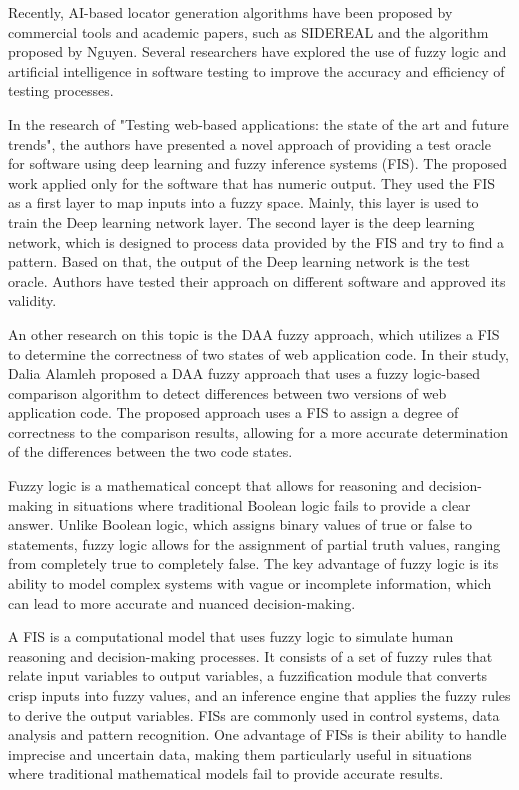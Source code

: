 \documentclass{article}
\begin{document}
Recently, AI-based locator generation algorithms have been proposed by commercial tools and academic papers\cite{ai_in_testing}, such as SIDEREAL\cite{sidereal} and the algorithm proposed by Nguyen\cite{nguyen}. Several researchers have explored the use of fuzzy logic and artificial intelligence in software testing to improve the accuracy and efficiency of testing processes.

In the research of "Testing web-based applications: the state of the art and future trends"\cite{state_of_art}, the authors have presented a novel approach of providing a test oracle for software using deep learning and fuzzy inference systems (FIS)\cite{fuzzy_logic}. The proposed work applied only for the software that has numeric output. They used the FIS as a first layer to map inputs into a fuzzy space. Mainly, this layer is used to train the Deep learning network layer. The second layer is the deep learning network, which is designed to process data provided by the FIS and try to find a pattern. Based on that, the output of the Deep learning network is the test oracle. Authors have tested their approach on different software and approved its validity.

An other research on this topic is the DAA fuzzy approach\cite{fuzzy_ai_in_web_testing}, which utilizes a FIS\cite{fuzzy_logic} to determine the correctness of two states of web application code. In their study, Dalia Alamleh proposed a DAA fuzzy approach that uses a fuzzy logic-based comparison algorithm to detect differences between two versions of web application code. The proposed approach uses a FIS\cite{fuzzy_logic} to assign a degree of correctness to the comparison results, allowing for a more accurate determination of the differences between the two code states.

Fuzzy logic\cite{fuzzy_logic} is a mathematical concept that allows for reasoning and decision-making in situations where traditional Boolean logic fails to provide a clear answer. Unlike Boolean logic, which assigns binary values of true or false to statements, fuzzy logic allows for the assignment of partial truth values, ranging from completely true to completely false. The key advantage of fuzzy logic is its ability to model complex systems with vague or incomplete information, which can lead to more accurate and nuanced decision-making.

A FIS\cite{fuzzy_logic} is a computational model that uses fuzzy logic to simulate human reasoning and decision-making processes. It consists of a set of fuzzy rules that relate input variables to output variables, a fuzzification module that converts crisp inputs into fuzzy values, and an inference engine that applies the fuzzy rules to derive the output variables. FISs are commonly used in control systems, data analysis and pattern recognition. One advantage of FISs is their ability to handle imprecise and uncertain data, making them particularly useful in situations where traditional mathematical models fail to provide accurate results.
\end{document}
